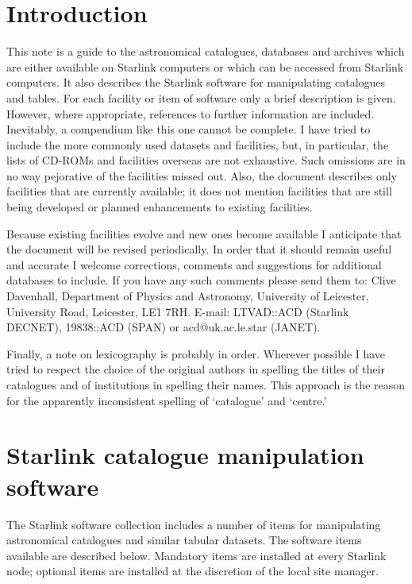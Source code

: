 \documentclass[twoside,11pt,nolof]{starlink}
\begin{document}
\scfrontmatter

\section{Introduction}

This note is a guide to the astronomical catalogues, databases and
archives which are either available on Starlink computers or which can
be accessed from Starlink computers. It also describes the Starlink
software for manipulating catalogues and tables. For each facility or
item of software only a brief description is given. However, where
appropriate, references to further information are included. Inevitably,
a compendium like this one cannot be complete. I have tried to include
the more commonly used datasets and facilities, but, in particular, the
lists of CD-ROMs and facilities overseas are not exhaustive. Such
omissions are in no way pejorative of the facilities missed out. Also,
the document describes only facilities that are currently available; it
does not mention facilities that are still being developed or planned
enhancements to existing facilities.

Because existing facilities evolve and new ones become available I
anticipate that the document will be revised periodically. In order that
it should remain useful and accurate I welcome corrections, comments and
suggestions for additional databases to include. If you have any such
comments please send them to: Clive Davenhall, Department of Physics and
Astronomy, University of Leicester, University Road, Leicester, LE1 7RH.
E-mail: LTVAD::ACD (Starlink DECNET), 19838::ACD (SPAN) or
acd@uk.ac.le.star (JANET).

Finally, a note on lexicography is probably in order. Wherever possible
I have tried to respect the choice of the original authors in spelling
the titles of their catalogues and of institutions in spelling their
names. This approach is the reason for the apparently inconsistent
spelling of `catalogue' and `centre.'

\section{Starlink catalogue manipulation software
}

The Starlink software collection includes a number of items for
manipulating astronomical catalogues and similar tabular datasets. The
software items available are described below. Mandatory items are
installed at every Starlink node; optional items are installed at the
discretion of the local site manager.
\end{document}
